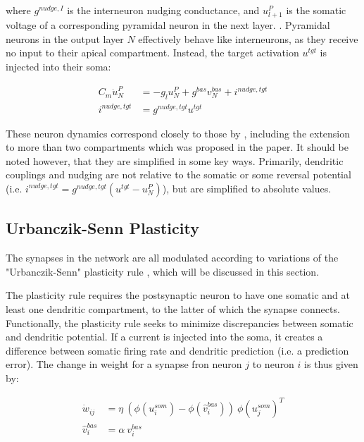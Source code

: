 where $ g^{nudge, I}$ is the interneuron nudging conductance, and $u_{l+1}^P$ is the somatic voltage of a corresponding
pyramidal neuron in the next layer. . Pyramidal neurons
in the output layer $N$ effectively behave like interneurons, as they receive no input to their apical compartment. Instead,
the target  activation $u^{tgt}$ is injected into their soma:

\begin{align}
  C_m \dot{u}_N^P & = - g_l u_N^{P} + g^{bas} v_N^{bas} + i^{nudge, tgt} \\
  i^{nudge, tgt}  & = g^{nudge, tgt} u^{tgt}
\end{align}


These neuron dynamics correspond closely to those by \cite{urbanczik2014learning}, including
the extension to more than two compartments which was proposed in the paper. It should be noted however, that they are
simplified in some key ways. Primarily, dendritic couplings and nudging are not relative to the somatic or some reversal potential
(i.e. $i^{nudge, tgt}= g^{nudge, tgt} (u^{tgt} - u_N^P )$),
but are simplified to absolute values. 



\subsection{Urbanczik-Senn Plasticity}\label{sec-urb-senn-plast}

The synapses in the network are all modulated according to variations of the "Urbanczik-Senn" plasticity rule \citep{urbanczik2014learning},
which will be discussed in this section.

The plasticity rule requires the postsynaptic neuron to have one somatic and at least one dendritic compartment, to
the latter of which the synapse connects. Functionally, the plasticity rule seeks to minimize discrepancies between
somatic and dendritic potential. If a current is injected into the soma, it creates a difference between somatic
firing rate and dendritic prediction (i.e. a prediction error). The change in weight for a synapse fron neuron $j$ to neuron
$i$ is thus given by:

\begin{align}
  \dot{w}_{ij}    & = \eta \ ( \phi(u_i^{som}) - \phi(\hat{v}_i^{bas}) ) \ \phi(u_j^{som})^T \\
  \hat{v}_i^{bas} & = \alpha \  v_i^{bas}
\end{align}

